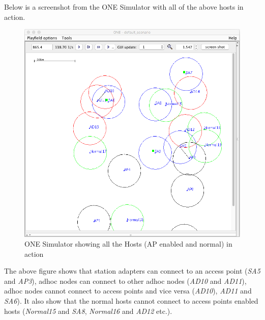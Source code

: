 	\newpage
	Below is a screenshot from the ONE Simulator with all of the above hosts in action.\newline
	\begin{figure}[H]
		\centering
		\includegraphics[scale=0.5]{./figures/aps-2}
		\caption{ONE Simulator showing all the Hosts (AP enabled and normal) in action}
	\end{figure}
	The above figure shows that station adapters can connect to an access point (\textit{SA5} and \textit{AP3}), adhoc nodes can connect to other adhoc nodes (\textit{AD10} and \textit{AD11}), adhoc nodes cannot connect to access points and vice versa (\textit{AD10}), \textit{AD11} and \textit{SA6}). It also show that the normal hosts cannot connect to access points enabled hosts (\textit{Normal15} and \textit{SA8}, \textit{Normal16} and \textit{AD12} etc.).

\newpage
